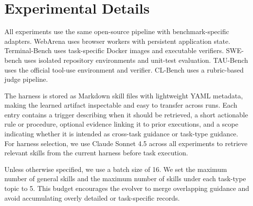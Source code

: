 \section{Experimental Details}
\label{app:details}
All experiments use the same open-source pipeline with benchmark-specific adapters. WebArena uses browser workers with persistent application state. Terminal-Bench uses task-specific Docker images and executable verifiers. SWE-bench uses isolated repository environments and unit-test evaluation. TAU-Bench uses the official tool-use environment and verifier. CL-Bench uses a rubric-based judge pipeline.

The harness is stored as Markdown skill files with lightweight YAML metadata, making the learned artifact inspectable and easy to transfer across runs. Each entry contains a trigger describing when it should be retrieved, a short actionable rule or procedure, optional evidence linking it to prior executions, and a scope indicating whether it is intended as cross-task guidance or task-type guidance. For harness selection, we use Claude Sonnet 4.5 across all experiments to retrieve relevant skills from the current harness before task execution.

Unless otherwise specified, we use a batch size of 16. We set the maximum number of general skills and the maximum number of skills under each task-type topic to 5. This budget encourages the evolver to merge overlapping guidance and avoid accumulating overly detailed or task-specific records.


